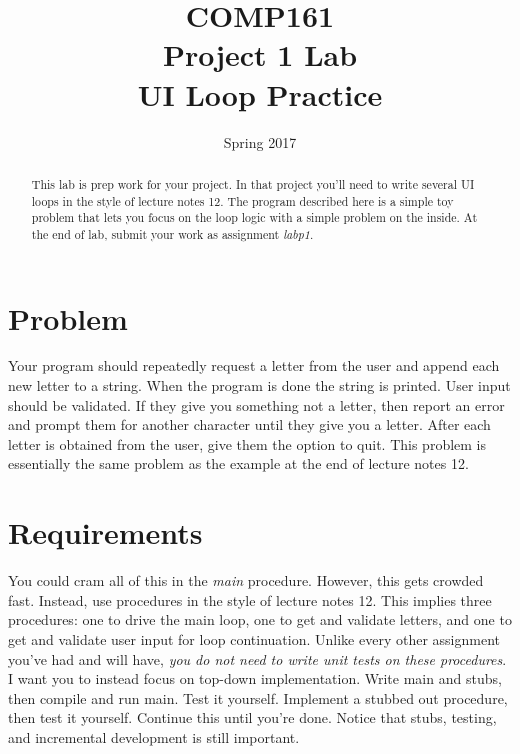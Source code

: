 \documentclass[]{tufte-handout}
\title{COMP161 \\ Project 1 Lab \\ UI Loop Practice}
\author{}
\date{Spring 2017}
\begin{document}
\maketitle

\begin{abstract}
This lab is prep work for your project. In that project you'll need to write several UI loops in the style of lecture notes 12. The program described here is a simple toy problem that lets you focus on the loop logic with a simple problem on the inside. At the end of lab, submit your work as assignment \textit{labp1}.
\end{abstract}

\section{Problem}

Your program should repeatedly request a letter from the user and append each new letter to a string. When the program is done the string is printed. User input should be validated. If they give you something not a letter, then report an error and prompt them for another character until they give you a letter.  After each letter is obtained from the user, give them the option to quit. This problem is essentially the same problem as the example at the end of lecture notes 12.

\section{Requirements}

You could cram all of this in the \textit{main} procedure. However, this gets crowded fast. Instead, use procedures in the style of lecture notes 12. This implies three procedures: one to drive the main loop, one to get and validate letters, and one to get and validate user input for loop continuation. Unlike every other assignment you've had and will have, \textit{you do not need to write unit tests on these procedures}.  I want you to instead focus on top-down implementation. Write main and stubs, then compile and run main. Test it yourself. Implement a stubbed out procedure, then test it yourself. Continue this until you're done. Notice that stubs, testing, and incremental development is still important.
\end{document}
